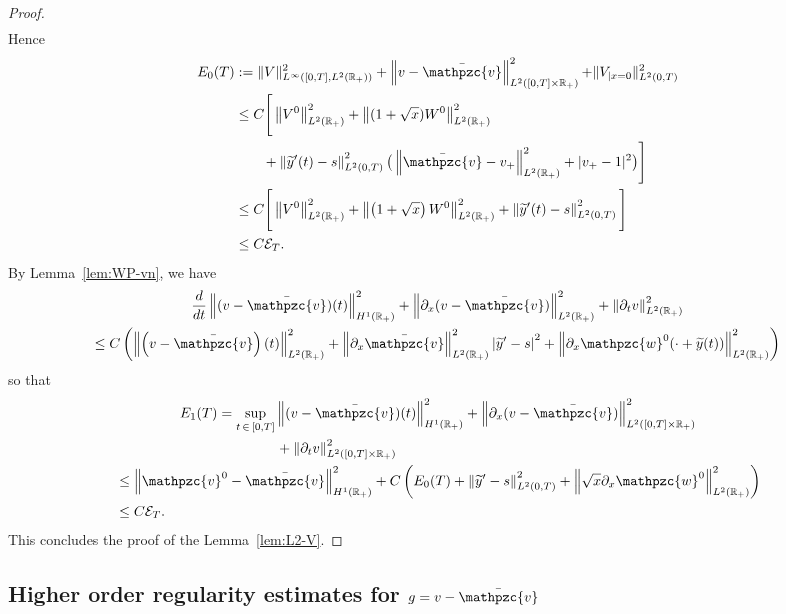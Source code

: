 \documentclass[AHL,Unicode,longabstracts,published]{cedram}
\newcommand{\R}{\mathbb{R}}
\newcommand{\p}{\partial}
\newcommand{\bv}{\bar{\mathpzc{v}}}
\newcommand{\cE}{\mathcal E}
\newcommand{\tv}{\mathpzc{v}}
\newcommand{\tw}{\mathpzc{w}}
\newcommand{\ty}{\widetilde{y}}
\begin{document}
\begin{proof}
\begin{equation}
\begin{aligned}
\end{aligned}
\end{equation}
Hence
\begin{align}\label{eq:est_E0}
E_0(T)& := \|V\|_{L^\infty\left([0,T], L^2(\R_+)\right)}^2 + \left\|v - \bv \right\|_{L^2\left([0,T] \times \R_+\right)}^2 {+ \| V_{|x=0}\|_{L^2(0,T)}^2}\nonumber \\
& \leq C \Bigg[\left\|V^{0}\right\|_{L^2(\R_+)}^2 +
\left\|(1+\sqrt{x}) W^0\right\|_{L^2(\R_+)}^2 \nonumber \\
& \qquad + \left\|\ty'(t)-s\right\|_{L^2(0,T)}^2 \big(\left\|\bv- v_+\right\|_{L^2(\R_+)}^2 + |v_+-1|^2 \big)
\Bigg] \nonumber\\
& \leq C \Bigg[\left\|V^{0}\right\|_{L^2(\R_+)}^2 +
\left\|\left(1+\sqrt{x}\right) W^0\right\|_{L^2(\R_+)}^2 +\left\|\ty'(t)-s\right\|_{L^2(0,T)}^2 \Bigg]
\\
&\leq C \cE_T.
\end{align}
By Lemma~\ref{lem:WP-vn}, we have
\begin{multline*}
\dfrac{d}{dt} \left\|(v-\bv)(t)\right\|_{H^1(\R_+)}^2 + \left\|\partial_x (v-\bv) \right\|_{L^2(\R_+)}^2 + \left\|\partial_t v \right\|_{L^2(\R_+)}^2\\
\leq C \left(\left\|\left(v-\bv\right)(t) \right\|_{L^2(\R_+)}^2 + \left\|\partial_x \bv\right\|_{L^2(\R_+)}^2 \left|\ty' -s\right|^2 + \left\| \partial_x\tw^0(\cdot +\ty(t))\right\|_{L^2(\R_+)}^2\right)
\end{multline*}
so that
\begin{multline}\label{estim-E1}
E_1(T)
= \sup_{t\,\in\,[0,T]} \left\|(v-\bv)(t)\right\|_{H^1(\R_+)}^2 + \left\|\partial_x (v-\bv)\right\|_{L^2\left([0,T] \times \R_+\right)}^2 \\
\begin{aligned}
&\mkern207mu + \left\|\partial_t v \right\|_{L^2\left([0,T] \times \R_+\right)}^2  \\
& \leq
\left\|\tv^0-\bv\right\|_{H^1(\R_+)}^2 + C\left(E_0(T) + \left\|\ty'-s\right\|_{L^2(0,T)}^2+ \left\| \sqrt{x}\p_x \tw^0\right\|_{L^2(\R_+)}^2\right)\\
&\leq C \cE_T.
\end{aligned}
\end{multline}
This concludes the proof of the Lemma~\ref{lem:L2-V}.
\end{proof}



\subsection{Higher order regularity estimates for \texorpdfstring{$g=v-\bv$}{g}}\label{sec:regularity-v}
\end{document}
